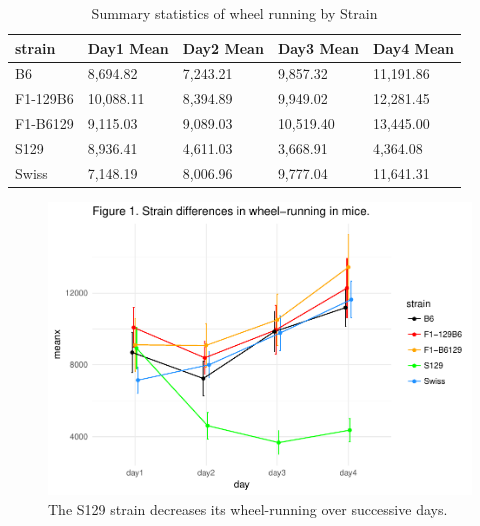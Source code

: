 \documentclass[english,man]{apa6}
\theoremstyle{definition}
\theoremstyle{definition}
\theoremstyle{definition}
\theoremstyle{remark}
\begin{document}
\begin{table}[tbp]
\begin{center}
\begin{threeparttable}
\caption{\label{tab:table1}Summary statistics of wheel running by Strain}
\begin{tabular}{lllll}
\toprule
strain & \multicolumn{1}{c}{Day1 Mean} & \multicolumn{1}{c}{Day2 Mean} & \multicolumn{1}{c}{Day3 Mean} & \multicolumn{1}{c}{Day4 Mean}\\
\midrule
B6 & 8,694.82 & 7,243.21 & 9,857.32 & 11,191.86\\
F1-129B6 & 10,088.11 & 8,394.89 & 9,949.02 & 12,281.45\\
F1-B6129 & 9,115.03 & 9,089.03 & 10,519.40 & 13,445.00\\
S129 & 8,936.41 & 4,611.03 & 3,668.91 & 4,364.08\\
Swiss & 7,148.19 & 8,006.96 & 9,777.04 & 11,641.31\\
\bottomrule
\end{tabular}
\end{threeparttable}
\end{center}
\end{table}

\begin{figure}

{\centering \includegraphics{james_paper_files/figure-latex/fig1-1} 

}

\caption{The S129 strain decreases its wheel-running over successive days.}\label{fig:fig1}
\end{figure}
\end{document}
